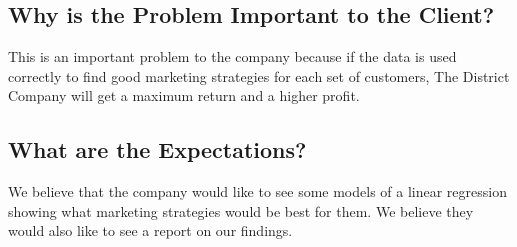 \documentclass[11pt]{report}
\begin{document}
\subsection*{\hspace{-.5cm} Why is the Problem Important to the
Client?}\label{tech} 
This is an important problem to the company because if the data is used
correctly to find good marketing strategies for each set of customers, The
District Company will get a maximum return and a higher profit.

\subsection*{\hspace{-.5cm} What are the Expectations?}\label{tech}
We believe that the company would like to see some models of a linear regression
showing what marketing strategies would be best for them.  We believe they would
also like to see a report on our findings.
\end{document}
